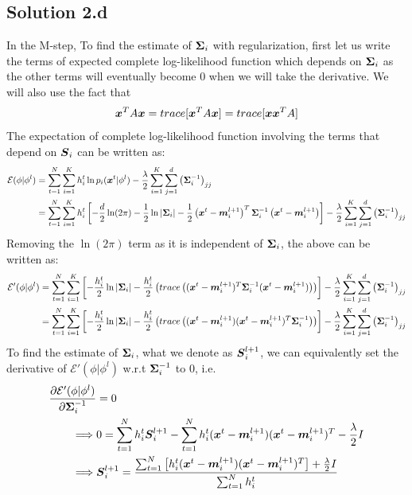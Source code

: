 \subsection*{Solution 2.d}
In the M-step, To find the estimate of $\boldsymbol{\Sigma}_i$ with regularization, first let us write the terms of expected complete log-likelihood function which depends on $\boldsymbol{\Sigma}_i$ as the other terms will eventually become 0 when we will take the derivative. We will also use the fact that
\begin{equation*}
\boldsymbol{x}^T A \boldsymbol{x} = trace[\boldsymbol{x}^T A \boldsymbol{x}] = trace[\boldsymbol{x} \boldsymbol{x}^T A]
\end{equation*} 
The expectation of complete log-likelihood function involving the terms that depend on $\boldsymbol{S}_i$ can be written as:
\begin{equation}
\begin{split}
\mathcal{E}(\phi|\phi^l) &= \sum_{t=1}^{N} \sum_{i=1}^{K} h_i^t \ln p_i(\boldsymbol{x}^t|\phi^l) - \frac{\lambda}{2}\sum_{i=1}^{K} \sum_{j=1}^{d}\left(\boldsymbol{\Sigma}_i^{-1}\right)_{jj}\\
&= \sum_{t=1}^{N} \sum_{i=1}^{K} h_i^t\left[-\frac{d}{2}\ln (2\pi) - \frac{1}{2}\ln |\boldsymbol{\Sigma}_i| - \frac{1}{2}\left(\boldsymbol{x}^t-\boldsymbol{m}^{l+1}_i\right)^T \boldsymbol{\Sigma}_i^{-1}\left(\boldsymbol{x}^t-\boldsymbol{m}^{l+1}_i\right)\right]-\frac{\lambda}{2} \sum_{i=1}^{K} \sum_{j=1}^{d}\left(\boldsymbol{\Sigma}_i^{-1}\right)_{jj}\\
\end{split}
\end{equation}
Removing the $\ln(2\pi)$ term as it is independent of $\boldsymbol{\Sigma}_i$, the above can be written as:
\begin{equation}
	\begin{split}
		\mathcal{E}'(\phi|\phi^l) &= \sum_{t=1}^{N} \sum_{i=1}^{K} \left[-\frac{h_i^t}{2}\ln|\boldsymbol{\Sigma}_i| - \frac{h^t_i}{2}\left(trace\left((\boldsymbol{x}^t-\boldsymbol{m}^{l+1}_i)^T \boldsymbol{\Sigma}_i^{-1}(\boldsymbol{x}^t-\boldsymbol{m}^{l+1}_i)\right)\right)\right]-\frac{\lambda}{2} \sum_{i=1}^{K} \sum_{j=1}^{d}\left(\boldsymbol{\Sigma}_i^{-1}\right)_{jj}\\
		&= \sum_{t=1}^{N} \sum_{i=1}^{K} \left[-\frac{h_i^t}{2}\ln|\boldsymbol{\Sigma}_i| - \frac{h^t_i}{2}\left(trace\left((\boldsymbol{x}^t-\boldsymbol{m}^{l+1}_i) (\boldsymbol{x}^t-\boldsymbol{m}^{l+1}_i)^T \boldsymbol{\Sigma}_i^{-1}\right)\right)\right]-\frac{\lambda}{2} \sum_{i=1}^{K} \sum_{j=1}^{d}\left(\boldsymbol{\Sigma}_i^{-1}\right)_{jj}\\
	\end{split}
\end{equation}
To find the estimate of $\boldsymbol{\Sigma}_i$, what we denote as $\boldsymbol{S}^{l+1}_i$, we can equivalently set the derivative of $\mathcal{E}'(\phi|\phi^l)$ w.r.t $\boldsymbol{\Sigma}_i^{-1}$ to 0, i.e.
\begin{equation}
\begin{split}
\frac{\partial \mathcal{E}'(\phi|\phi^l)}{\partial \boldsymbol{\Sigma}_i^{-1}} &= 0\\
\implies & 0 = \sum_{t=1}^{N}h^t_i \boldsymbol{S}^{l+1}_i - \sum_{t=1}^{N}h^t_i(\boldsymbol{x}^t-\boldsymbol{m}^{l+1}_i)(\boldsymbol{x}^t-\boldsymbol{m}^{l+1}_i)^T-\frac{\lambda}{2}I\\
\implies & \boldsymbol{S}^{l+1}_i = \frac{\sum_{t=1}^{N} \left[h^t_i (\boldsymbol{x}^t-\boldsymbol{m}^{l+1}_i)(\boldsymbol{x}^t-\boldsymbol{m}^{l+1}_i)^T\right]+\frac{\lambda}{2}I}{\sum_{t=1}^{N}h^t_i}
\end{split}
\end{equation}
\newpage
